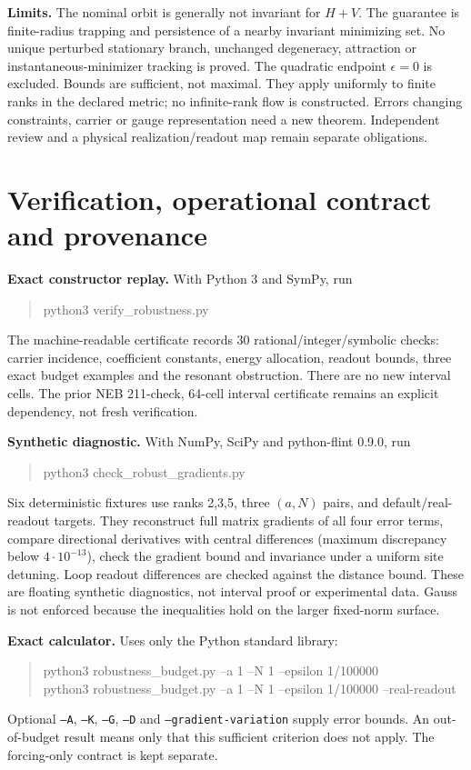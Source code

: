 \documentclass[11pt,a4paper]{article}
\begin{document}
\textbf{Limits.} The nominal orbit is generally not invariant for $H+V$. The guarantee is finite-radius trapping and persistence of a nearby invariant minimizing set. No unique perturbed stationary branch, unchanged degeneracy, attraction or instantaneous-minimizer tracking is proved. The quadratic endpoint $\epsilon=0$ is excluded. Bounds are sufficient, not maximal. They apply uniformly to finite ranks in the declared metric; no infinite-rank flow is constructed. Errors changing constraints, carrier or gauge representation need a new theorem. Independent review and a physical realization/readout map remain separate obligations.
\newpage
\section{Verification, operational contract and provenance}
\textbf{Exact constructor replay.} With Python 3 and SymPy, run
\begin{quote}\ttfamily python3 verify\_robustness.py\end{quote}
The machine-readable certificate records 30 rational/integer/symbolic checks: carrier incidence, coefficient constants, energy allocation, readout bounds, three exact budget examples and the resonant obstruction. There are no new interval cells. The prior NEB 211-check, 64-cell interval certificate remains an explicit dependency, not fresh verification.

\textbf{Synthetic diagnostic.} With NumPy, SciPy and python-flint 0.9.0, run
\begin{quote}\ttfamily python3 check\_robust\_gradients.py\end{quote}
Six deterministic fixtures use ranks 2,3,5, three $(a,N)$ pairs, and default/real-readout targets. They reconstruct full matrix gradients of all four error terms, compare directional derivatives with central differences (maximum discrepancy below $4\cdot10^{-13}$), check the gradient bound and invariance under a uniform site detuning. Loop readout differences are checked against the distance bound. These are floating synthetic diagnostics, not interval proof or experimental data. Gauss is not enforced because the inequalities hold on the larger fixed-norm surface.

\textbf{Exact calculator.} Uses only the Python standard library:
\begin{quote}\ttfamily
python3 robustness\_budget.py --a 1 --N 1 --epsilon 1/100000\\
python3 robustness\_budget.py --a 1 --N 1 --epsilon 1/100000 --real-readout
\end{quote}
Optional \texttt{--A}, \texttt{--K}, \texttt{--G}, \texttt{--D} and \texttt{--gradient-variation} supply error bounds. An out-of-budget result means only that this sufficient criterion does not apply. The forcing-only contract is kept separate.
\end{document}
